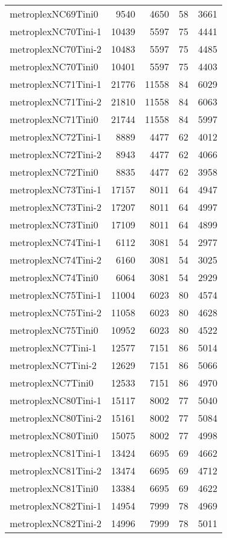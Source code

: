 \begin{longtable}{lrrrr}
metroplexNC69Tini0 & 9540 & 4650 & 58 & 3661 \\
metroplexNC70Tini-1 & 10439 & 5597 & 75 & 4441 \\
metroplexNC70Tini-2 & 10483 & 5597 & 75 & 4485 \\
metroplexNC70Tini0 & 10401 & 5597 & 75 & 4403 \\
metroplexNC71Tini-1 & 21776 & 11558 & 84 & 6029 \\
metroplexNC71Tini-2 & 21810 & 11558 & 84 & 6063 \\
metroplexNC71Tini0 & 21744 & 11558 & 84 & 5997 \\
metroplexNC72Tini-1 & 8889 & 4477 & 62 & 4012 \\
metroplexNC72Tini-2 & 8943 & 4477 & 62 & 4066 \\
metroplexNC72Tini0 & 8835 & 4477 & 62 & 3958 \\
metroplexNC73Tini-1 & 17157 & 8011 & 64 & 4947 \\
metroplexNC73Tini-2 & 17207 & 8011 & 64 & 4997 \\
metroplexNC73Tini0 & 17109 & 8011 & 64 & 4899 \\
metroplexNC74Tini-1 & 6112 & 3081 & 54 & 2977 \\
metroplexNC74Tini-2 & 6160 & 3081 & 54 & 3025 \\
metroplexNC74Tini0 & 6064 & 3081 & 54 & 2929 \\
metroplexNC75Tini-1 & 11004 & 6023 & 80 & 4574 \\
metroplexNC75Tini-2 & 11058 & 6023 & 80 & 4628 \\
metroplexNC75Tini0 & 10952 & 6023 & 80 & 4522 \\
metroplexNC7Tini-1 & 12577 & 7151 & 86 & 5014 \\
metroplexNC7Tini-2 & 12629 & 7151 & 86 & 5066 \\
metroplexNC7Tini0 & 12533 & 7151 & 86 & 4970 \\
metroplexNC80Tini-1 & 15117 & 8002 & 77 & 5040 \\
metroplexNC80Tini-2 & 15161 & 8002 & 77 & 5084 \\
metroplexNC80Tini0 & 15075 & 8002 & 77 & 4998 \\
metroplexNC81Tini-1 & 13424 & 6695 & 69 & 4662 \\
metroplexNC81Tini-2 & 13474 & 6695 & 69 & 4712 \\
metroplexNC81Tini0 & 13384 & 6695 & 69 & 4622 \\
metroplexNC82Tini-1 & 14954 & 7999 & 78 & 4969 \\
metroplexNC82Tini-2 & 14996 & 7999 & 78 & 5011 \\

\end{longtable}
